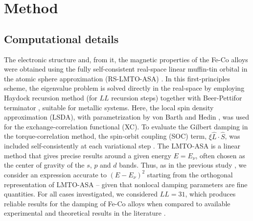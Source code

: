 \section{Method}
\label{sec:methods}

\subsection{Computational details}
\label{subsec:DFT}

The electronic structure and, from it, the magnetic properties of the Fe-Co alloys were obtained using the fully self-consistent real-space linear muffin-tin orbital in the atomic sphere approximation (RS-LMTO-ASA) \cite{PhysRevB.44.13283,PhysRevB.46.14570}. In this first-principles scheme, the eigenvalue problem is solved directly in the real-space by employing Haydock recursion method \cite{Haydock1980} (for $LL$ recursion steps) together with Beer-Pettifor terminator \cite{Beer1984}, suitable for metallic systems. Here, the local spin density approximation (LSDA), with parametrization by von Barth and Hedin \cite{Barth1972}, was used for the exchange-correlation functional (XC). To evaluate the Gilbert damping in the torque-correlation method, the spin-orbit coupling (SOC) term, $\xi\hat{L}\cdot\hat{S}$, was included self-consistently at each variational step \cite{PhysRevB.69.104401}. 
The LMTO-ASA \cite{PhysRevB.12.3060} is a linear method that gives precise results around a given energy $E=E_{\nu}$, often chosen as the center of gravity of the $s$, $p$ and $d$ bands. Thus, as in the previous study \cite{PhysRevB.108.014433}, we consider an expression accurate to $(E-E_{\nu})^2$ starting from the orthogonal representation of LMTO-ASA -- given that nonlocal damping parameters are fine quantities. For all cases investigated, we considered $LL=31$, which produces reliable results for the damping of Fe-Co alloys when compared to available experimental and theoretical results in the literature \cite{PhysRevB.108.014433}.


